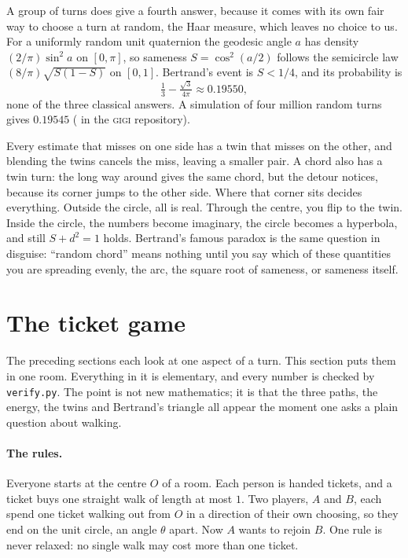 \documentclass[11pt]{article}
\begin{document}
A group of turns does give a fourth answer, because it comes with its own fair way to
choose a turn at random, the Haar measure, which leaves no choice to us. For a uniformly
random unit quaternion the geodesic angle $a$ has density $(2/\pi)\sin^2a$ on $[0,\pi]$, so
sameness $S=\cos^2(a/2)$ follows the semicircle law $(8/\pi)\sqrt{S(1-S)}$ on $[0,1]$. Bertrand's
event is $S<1/4$, and its probability is
\[
\tfrac13-\tfrac{\sqrt3}{4\pi}\approx0.19550,
\]
none of the three classical answers. A simulation of four million random turns gives
$0.19545$ ( in the \textsc{gigi} repository).

\begin{plain}
Every estimate that misses on one side has a twin that misses on the other, and blending
the twins cancels the miss, leaving a smaller pair. A chord also has a twin turn: the long
way around gives the same chord, but the detour notices, because its corner jumps to the
other side. Where that corner sits decides everything. Outside the circle, all is real.
Through the centre, you flip to the twin. Inside the circle, the numbers become imaginary,
the circle becomes a hyperbola, and still $S+d^2=1$ holds. Bertrand's famous paradox is the
same question in disguise: ``random chord'' means nothing until you say which of these
quantities you are spreading evenly, the arc, the square root of sameness, or sameness
itself.
\end{plain}

\section{The ticket game}\label{sec:tickets}

The preceding sections each look at one aspect of a turn. This section puts them in one
room. Everything in it is elementary, and every number is checked by \texttt{verify.py}.
The point is not new mathematics; it is that the three paths, the energy, the twins and
Bertrand's triangle all appear the moment one asks a plain question about walking.

\paragraph{The rules.} Everyone starts at the centre $O$ of a room. Each person is handed
tickets, and a ticket buys one straight walk of length at most $1$. Two players, $A$ and
$B$, each spend one ticket walking out from $O$ in a direction of their own choosing, so
they end on the unit circle, an angle $\theta$ apart. Now $A$ wants to rejoin $B$. One
rule is never relaxed: no single walk may cost more than one ticket.
\end{document}
